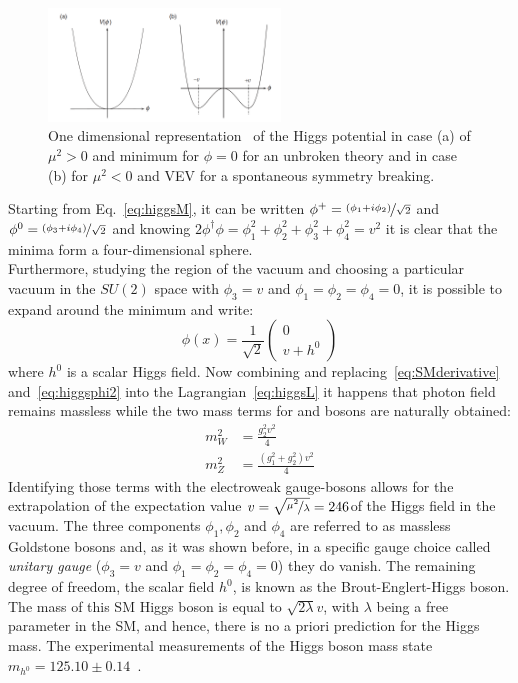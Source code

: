 \begin{figure}[h]
\centering
\includegraphics[width=0.55\textwidth]{Figures/c1/higgsPotential}
\caption{One dimensional representation~\cite{thomson_2013} of the Higgs potential in case (a) of $\mu^2 > 0$ and minimum for $\phi = 0$ for an unbroken theory and in case (b) for $\mu^2 < 0$ and VEV for a spontaneous symmetry breaking.}
\label{fig:mexico}
\end{figure}

Starting from Eq.~\ref{eq:higgsM}, it can be written $\phi^+=\nicefrac{(\phi_1 + i\phi_2)}{\sqrt{2}}$ and $\phi^0=\nicefrac{(\phi_3 + i\phi_4)}{\sqrt{2}}$ and knowing $2\phi^\dag \phi = \phi^2_1+\phi^2_2+ \phi^2_3+ \phi^2_4 = v^2$ it is clear that the minima form a four-dimensional sphere.\\
Furthermore, studying the region of the vacuum and choosing a particular vacuum in the $SU(2)$ space with $\phi_3 = v$ and $\phi_1=\phi_2=\phi_4=0$, it is possible to expand around the minimum and write:
\begin{equation}
\label{eq:higgsphi2}
\phi(x) = \frac{1}{\sqrt{2}}\begin{pmatrix}
0\\
v+ h^0
\end{pmatrix}
\end{equation}
where $h^0$ is a scalar Higgs field. Now combining and replacing~\ref{eq:SMderivative} and~\ref{eq:higgsphi2} into the Lagrangian~\ref{eq:higgsL} it happens that photon field remains massless while the two mass terms for \PW and \PZ bosons are naturally obtained:
\begin{align}
m^2_W &= \frac{g_2^2v^2}{4}\label{eq:massW}\\
m^2_Z &= \frac{(g_1^2+g_2^2)v^2}{4}\label{eq:massZ}
\end{align}
Identifying those terms with the electroweak gauge-bosons allows for the extrapolation of the expectation value $v = \sqrt{\nicefrac{\mu^2}{\lambda}} = 246$\GeV of the Higgs field in the vacuum.
The three components $\phi_1,\phi_2$ and $\phi_4$ are referred to as massless Goldstone bosons and, as it was shown before, in a specific gauge choice called \emph{unitary gauge} ($\phi_3 = v$ and $\phi_1=\phi_2=\phi_4=0$) they do vanish. The remaining degree of freedom, the scalar field $h^0$, is known as the Brout-Englert-Higgs boson. The mass of this SM Higgs boson is equal to $\sqrt{2\lambda}v$, with $\lambda$ being a free parameter in the SM, and
hence, there is no a priori prediction for the Higgs mass. The experimental measurements of the Higgs boson mass state  $m_{h^0}=125.10\pm0.14$\GeV~\cite{pdgw}. 

